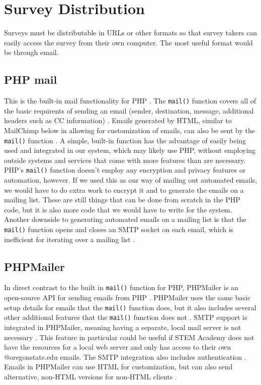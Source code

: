 \documentclass[letterpaper,10pt,serif, draftclsnofoot,onecolumn, compsoc, titlepage]{IEEEtran}
\begin{document}
\section{Survey Distribution}
Surveys must be distributable in URLs or other formats so that survey takers can easily access the survey from their own computer. The most useful format would be through email.
\subsection{PHP mail}
This is the built-in mail functionality for PHP \cite{php_mail}.
The \texttt{mail()} function covers all of the basic requirents of sending an email (sender, destination, message, additional headers such as CC information) \cite{php_mail}.
Emails generated by HTML, similar to MailChimp below in allowing for customization of emails, can also be sent by the \texttt{mail()} function \cite{php_mail}.
A simple, built-in function has the advantage of easily being used and integrated in our system, which may likely use PHP, without employing outside systems and services that come with more features than are necessary.
PHP's \texttt{mail()} function doesn't employ any encryption and privacy features or automation, however.
If we used this as our way of mailing out automated emails, we would have to do extra work to encrypt it and to generate the emails on a mailing list.
These are still things that can be done from scratch in the PHP code, but it is also more code that we would have to write for the system.
Another downside to generating automated emails on a mailing list is that the \texttt{mail()} function opens and closes an SMTP socket on each email, which is inefficient for iterating over a mailing list \cite{php_mail}.
\subsection{PHPMailer}
In direct contrast to the built in \texttt{mail()} function for PHP, PHPMailer is an open-source API for sending emails from PHP \cite{phpmailer}.
PHPMailer uses the same basic setup details for emails that the \texttt{mail()} function does, but it also includes several other additional features that the \texttt{mail()} function does not \cite{phpmailer}.
SMTP support is integrated in PHPMailer, meaning having a separate, local mail server is not necessary \cite{phpmailer}.
This feature in particular could be useful if STEM Academy does not have the resources for a local web server and only has access to their own @oregonstate.edu emails.
The SMTP integration also includes authentication \cite{phpmailer}.
Emails in PHPMailer can use HTML for customization, but can also send alternative, non-HTML versions for non-HTML clients \cite{phpmailer}.
\end{document}
